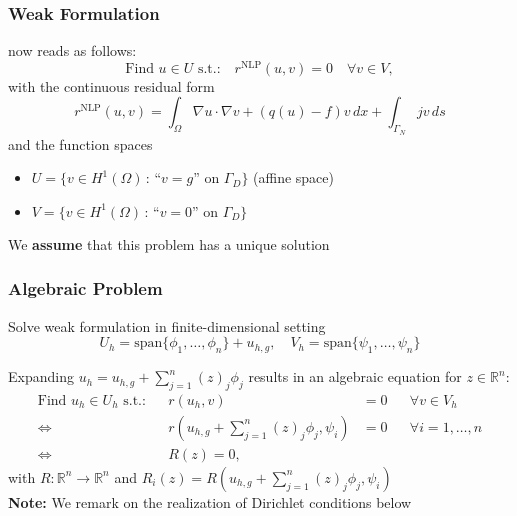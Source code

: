 \documentclass[aspectratio=169,11pt]{beamer}
\theoremstyle{definition}
\begin{document}
\begin{frame}
\frametitle{Weak Formulation}
now reads as follows:
\begin{equation}
\text{Find $u\in U$ s.t.:} \quad r^{\text{NLP}}(u,v)=0 \quad \forall v\in V,
\label{Eq:BasicBuildingBlock}
\end{equation}
with the continuous residual form
\begin{equation*}
r^{\text{NLP}}(u,v) = \int_\Omega \nabla u \cdot \nabla v + (q(u)-f)v\,dx + \int_{\Gamma_N} jv\,ds
\label{eq:ResidualForm}
\end{equation*}
and the function spaces
\begin{itemize}
\item $U= \{v\in H^1(\Omega) \,:\, \text{``$v=g$'' on $\Gamma_D$}\}$ (affine space)
\item $V= \{v\in H^1(\Omega) \,:\, \text{``$v=0$'' on $\Gamma_D$}\}$
\end{itemize}
\medskip
We \textbf{assume} that this problem has a unique solution
\end{frame}

\begin{frame}
\frametitle{Algebraic Problem}
\rightarrownice Solve weak formulation in finite-dimensional setting
\begin{equation*}
U_h=\text{span}\{\phi_1,\ldots,\phi_n\} + u_{h,g}, \quad V_h=\text{span}\{\psi_1,\ldots,\psi_n\}
\end{equation*}

Expanding $u_h=u_{h,g} + \sum_{j=1}^n (z)_j\phi_j$
results in an algebraic equation for $z\in\mathbb{R}^n$:
\begin{align*}
\text{Find $u_h\in U_h$ s.t.:} && r(u_h,v)&=0 && \forall v\in V_h\\
\Leftrightarrow{} && r\left(u_{h,g} +\sum_{j=1}^n (z)_j\phi_j,\psi_i\right) &= 0 &&\forall i=1,\ldots,n\\
\Leftrightarrow{} && R(z) = 0,
\end{align*}
with $R: \mathbb{R}^n \to \mathbb{R}^n$ and $R_i(z) = R\left(u_{h,g} +\sum_{j=1}^n (z)_j\phi_j,\psi_i\right)$ \\
\medskip
\textbf{Note:} We remark on the realization of Dirichlet conditions below
\end{frame}
\end{document}
